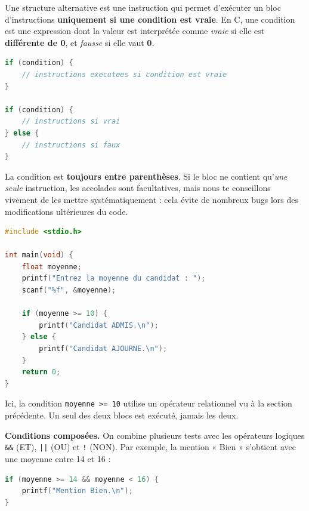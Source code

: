 \documentclass[11pt]{article}
\newcommand{\cle}[1]{{\popxbold\color{popdark}#1}}
\begin{document}
\begin{definition}
Une \cle{structure alternative} est une instruction qui permet d'exécuter un bloc d'instructions \textbf{uniquement si une condition est vraie}. En C, une condition est une expression dont la valeur est interprétée comme \emph{vraie} si elle est \textbf{différente de 0}, et \emph{fausse} si elle vaut \textbf{0}.
\end{definition}

\begin{propriete}
\begin{lstlisting}[language=C]
if (condition) {
    // instructions executees si condition est vraie
}

if (condition) {
    // instructions si vrai
} else {
    // instructions si faux
}
\end{lstlisting}
La condition est \textbf{toujours entre parenthèses}. Si le bloc ne contient qu'\emph{une seule} instruction, les accolades sont facultatives, mais nous te conseillons vivement de les mettre systématiquement : cela évite de nombreux bugs lors des modifications ultérieures du code.
\end{propriete}

\begin{exemplebox}
\begin{lstlisting}[language=C]
#include <stdio.h>

int main(void) {
    float moyenne;
    printf("Entrez la moyenne du candidat : ");
    scanf("%f", &moyenne);

    if (moyenne >= 10) {
        printf("Candidat ADMIS.\n");
    } else {
        printf("Candidat AJOURNE.\n");
    }
    return 0;
}
\end{lstlisting}
Ici, la condition \texttt{moyenne >= 10} utilise un opérateur relationnel vu à la section précédente. Un seul des deux blocs est exécuté, jamais les deux.
\end{exemplebox}

\textbf{Conditions composées.} On combine plusieurs tests avec les opérateurs logiques \texttt{\&\&} (ET), \texttt{||} (OU) et \texttt{!} (NON). Par exemple, la mention « Bien » s'obtient avec une moyenne entre 14 et 16 :

\begin{lstlisting}[language=C]
if (moyenne >= 14 && moyenne < 16) {
    printf("Mention Bien.\n");
}
\end{lstlisting}
\end{document}
